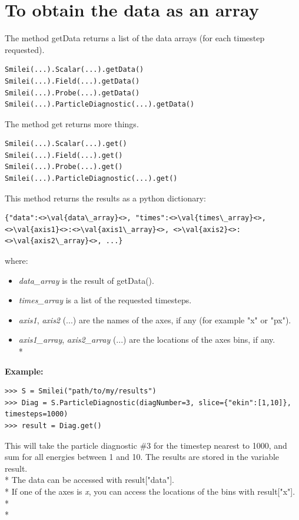 \documentclass[11pt]{article}
\newcommand{\code}[1]{\colorbox{yellow!15}{\ttfamily #1}}
\newcommand{\val}[1]{{\ttfamily \textit{#1}}}
\begin{document}
\section{To obtain the data as an array}
The method \code{getData} returns a list of the data arrays (for each timestep requested).
\begin{lstlisting}
Smilei(...).Scalar(...).getData()
Smilei(...).Field(...).getData()
Smilei(...).Probe(...).getData()
Smilei(...).ParticleDiagnostic(...).getData()
\end{lstlisting}

The method \code{get} returns more things.
\begin{lstlisting}
Smilei(...).Scalar(...).get()
Smilei(...).Field(...).get()
Smilei(...).Probe(...).get()
Smilei(...).ParticleDiagnostic(...).get()
\end{lstlisting}
This method returns the results as a python dictionary:
\begin{lstlisting}
{"data":<>\val{data\_array}<>, "times":<>\val{times\_array}<>, <>\val{axis1}<>:<>\val{axis1\_array}<>, <>\val{axis2}<>:<>\val{axis2\_array}<>, ...}
\end{lstlisting}
where:
\begin{itemize}
\item \val{data\_array} is the result of \code{getData()}.
\item \val{times\_array} is a list of the requested timesteps.
\item \val{axis1}, \val{axis2} (...) are the names of the axes, if any (for example \code{"x"} or \code{"px"}).
\item \val{axis1\_array}, \val{axis2\_array} (...) are the locations of the axes bins, if any.\\*
\end{itemize}

\textbf{Example:}
\begin{lstlisting}
>>> S = Smilei("path/to/my/results")
>>> Diag = S.ParticleDiagnostic(diagNumber=3, slice={"ekin":[1,10]}, timesteps=1000)
>>> result = Diag.get()
\end{lstlisting}
This will take the particle diagnostic \#3 for the timestep nearest to 1000, and sum for all energies between 1 and 10.
The results are stored in the variable \code{result}.\\*
The data can be accessed with \code{result["data"]}.\\*
If one of the axes is \val{x}, you can access the locations of the bins with \code{result["x"]}.\\* \\*
\end{document}

